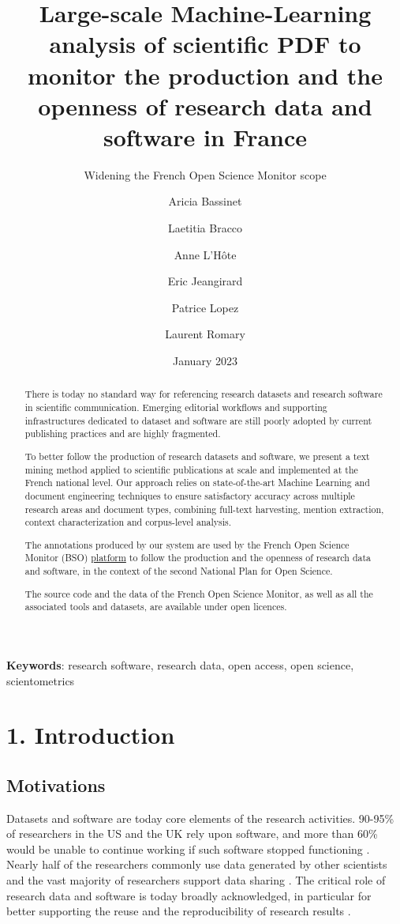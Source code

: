 \documentclass[
]{article}
\title{Large-scale Machine-Learning analysis of scientific PDF to
monitor the production and the openness of research data and software in
France}
\subtitle{Widening the French Open Science Monitor scope}
\author[%
  2%
  ]{%
  Aricia Bassinet%
}
\author[%
  2%
  ]{%
  Laetitia Bracco%
}
\author[%
  1%
  ]{%
  Anne L'Hôte%
}
\author[%
  1%
  ]{%
  Eric Jeangirard%
}
\author[%
  3%
  ]{%
  Patrice Lopez%
}
\author[%
  4%
  ]{%
  Laurent Romary%
}
\affil[1]{French Ministry of Higher Education, Research, Paris, France}
\affil[2]{University of Lorraine, France}
\affil[3]{science-miner, France}
\affil[4]{Inria, France}
\date{January 2023}
\begin{document}
\maketitle
\begin{abstract}
There is today no standard way for referencing research datasets and
research software in scientific communication. Emerging editorial
workflows and supporting infrastructures dedicated to dataset and
software are still poorly adopted by current publishing practices and
are highly fragmented.

To better follow the production of research datasets and software, we
present a text mining method applied to scientific publications at scale
and implemented at the French national level. Our approach relies on
state-of-the-art Machine Learning and document engineering techniques to
ensure satisfactory accuracy across multiple research areas and document
types, combining full-text harvesting, mention extraction, context
characterization and corpus-level analysis.

The annotations produced by our system are used by the French Open
Science Monitor (BSO)
\href{https://frenchopensciencemonitor.esr.gouv.fr}{platform} to follow
the production and the openness of research data and software, in the
context of the second National Plan for Open Science.

The source code and the data of the French Open Science Monitor, as well
as all the associated tools and datasets, are available under open
licences.
\end{abstract}

\textbf{Keywords}: research software, research data, open access, open
science, scientometrics

\hypertarget{introduction}{%
\section{1. Introduction}\label{introduction}}

\hypertarget{motivations}{%
\subsection{Motivations}\label{motivations}}

Datasets and software are today core elements of the research
activities. 90-95\% of researchers in the US and the UK rely upon
software, and more than 60\% would be unable to continue working if such
software stopped functioning \citep{olivier_philippe_2019_2585783}.
Nearly half of the researchers commonly use data generated by other
scientists \citep{science_2011} and the vast majority of researchers
support data sharing \citep{10.1371/journal.pone.0134826}. The critical
role of research data and software is today broadly acknowledged, in
particular for better supporting the reuse and the reproducibility of
research results \citep[,][]{LAURINAVICHYUTE2022104332}.
\end{document}
